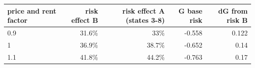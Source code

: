 \begin{tabular}{lrrrr}
\toprule
price and rent factor & risk effect B & risk effect A (states 3-8) & G base risk & dG from risk B \\
\midrule
0.9 & 31.6\% & 33\% & -0.558 & 0.122 \\
1 & 36.9\% & 38.7\% & -0.652 & 0.14 \\
1.1 & 41.8\% & 44.2\% & -0.763 & 0.17 \\
\bottomrule
\end{tabular}
